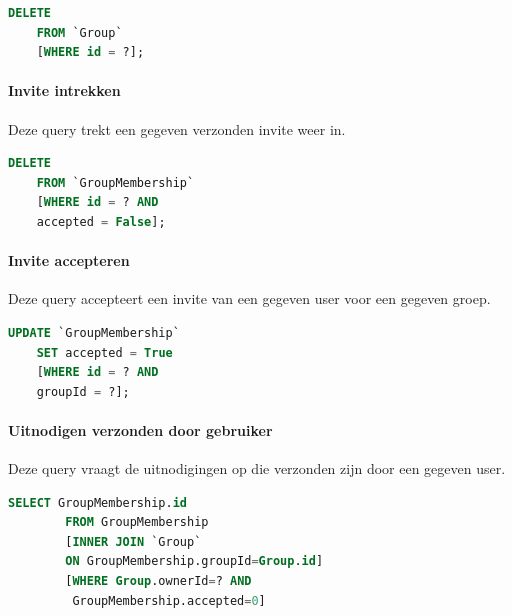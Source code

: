 \documentclass[11pt]{article}
\begin{document}
  \begin{framed}
  \begin{lstlisting}[language=sql]
    DELETE 
    FROM `Group` 
    [WHERE id = ?];
  \end{lstlisting}
  \end{framed}  
  
\paragraph{Invite intrekken}

  Deze query trekt een gegeven verzonden invite weer in.

  \begin{framed}
  \begin{lstlisting}[language=sql]
    DELETE 
    FROM `GroupMembership` 
    [WHERE id = ? AND 
    accepted = False];
  \end{lstlisting}
  \end{framed}
  
\paragraph{Invite accepteren}

  Deze query accepteert een invite van een gegeven user voor een gegeven groep.

  \begin{framed}
  \begin{lstlisting}[language=sql]
    UPDATE `GroupMembership`
    SET accepted = True
    [WHERE id = ? AND 
    groupId = ?];
  \end{lstlisting}
  \end{framed}  

\paragraph{Uitnodigen verzonden door gebruiker}

  Deze query vraagt de uitnodigingen op die verzonden zijn door een gegeven user.

  \begin{framed}
  \begin{lstlisting}[language=sql]
    SELECT GroupMembership.id
		FROM GroupMembership
		[INNER JOIN `Group`
		ON GroupMembership.groupId=Group.id]
		[WHERE Group.ownerId=? AND
		 GroupMembership.accepted=0]
  \end{lstlisting}
  \end{framed}
\end{document}
